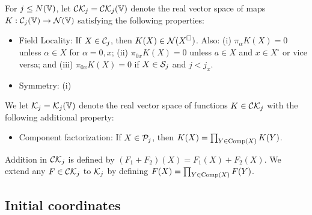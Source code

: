 
\begin{defn}
For $j \le N(\mathbb{V})$, let $\mathcal{C}\mathcal{K}_j = \mathcal{C}\mathcal{K}_j(\mathbb{V})$ denote the real
vector space of maps $K : \mathcal{C}_j(\mathbb{V}) \rightarrow \mathcal{N}(\mathbb{V})$ satisfying the following
properties:
\begin{itemize}
\item
Field Locality: If $X \in \mathcal{C}_j$, then $K(X) \in \mathcal{N}(X^\square)$.
Also: (i) $\pi_\alpha K(X) = 0$ unless $\alpha \in X$ for $\alpha = 0, x$;
(ii) $\pi_{0x} K(X) = 0$ unless $a\in X$ and $x \in X^\square$ or vice versa;
and (iii) $\pi_{0x} K(X) = 0$ if $X \in \mathcal{S}_j$ and $j < j_x$.

\item
Symmetry: (i) 
\end{itemize}
We let $\mathcal{K}_j = \mathcal{K}_j(\mathbb{V})$ denote the real vector space of functions
$K \in \mathcal{C}\mathcal{K}_j$ with the following additional property:
\begin{itemize}
\item
Component factorization: If $X \in \mathcal{P}_j$, then $K(X) = \prod_{Y\in{\rm Comp}(X)} K(Y)$.
\end{itemize}
\end{defn}

Addition in $\mathcal{C}\mathcal{K}_j$ is defined by $(F_1 + F_2)(X) = F_1(X) + F_2(X)$.
We extend any $F \in \mathcal{C}\mathcal{K}_j$ to $\mathcal{K}_j$ by defining
$F(X) = \prod_{Y\in{\rm Comp}(X)} F(Y)$.

\subsection{Initial coordinates}
\label{sec:initIK}

